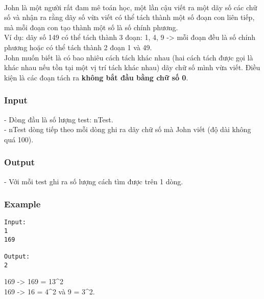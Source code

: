 

 

John là một người rất đam mê toán học, một lần cậu viết ra một dãy số các chữ số và nhận ra rằng dãy số vừa viết có thể tách thành một số đoạn con liên tiếp, mà mỗi đoạn con tạo thành một số là số chính phương.
\\Ví dụ: dãy số 149 có thể tách thành 3 đoạn: 1, 4, 9 -> mỗi đoạn đều là số chính phương hoặc có thể tách thành 2 đoạn 1 và 49.
\\John muốn biết là có bao nhiêu cách tách khác nhau (hai cách tách được gọi là khác nhau nếu tồn tại một vị trí tách khác nhau) dãy chữ số mình vừa viết. Điều kiện là các đoạn tách ra \textbf{không bắt đầu bằng chữ số 0}.

\subsubsection{Input}

- Dòng đầu là số lượng test: nTest.
\\- nTest dòng tiếp theo mỗi dòng ghi ra dãy chữ số mà John viết (độ dài không quá 100).

\subsubsection{Output}

- Với mỗi test ghi ra số lượng cách tìm được trên 1 dòng.

\subsubsection{Example}
\begin{verbatim}
Input:
1
169

Output:
2
\end{verbatim}

169 -> 169 = 13^2
\\169 -> 16 = 4^2 và 9 = 3^2.
